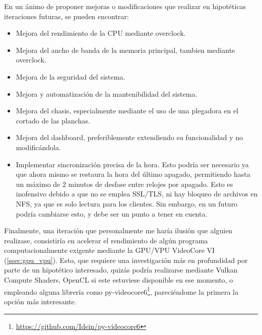 En un ánimo de proponer mejoras o modificaciones que realizar en hipotéticas iteraciones futuras, se pueden encontrar:
\begin{itemize}
    \item Mejora del rendimiento de la CPU mediante \gls{overclock}.
    \item Mejora del ancho de banda de la memoria principal, tambien mediante \gls{overclock}.
    \item Mejora de la seguridad del sistema.
    \item Mejora y automatización de la mantenibilidad del sistema.
    \item Mejora del chasis, especialmente mediante el uso de una plegadora en el cortado de las planchas.
    \item Mejora del dashboard, preferiblemente extendiendo su funcionalidad y no modificándola.
    \item Implementar sincronización precisa de la hora. Esto podría ser necesario ya que ahora mismo se restaura la hora del último apagado, permitiendo hasta un máximo de 2 minutos de desfase entre relojes por apagado. Esto es inofensivo debido a que no se emplea SSL/TLS, ni hay bloqueo de archivos en NFS, ya que es solo lectura para los clientes. Sin embargo, en un futuro podría cambiarse esto, y debe ser un punto a tener en cuenta.
\end{itemize}

Finalmente, una iteración que personalmente me haría ilusión que alguien realizase, consistiría en acelerar el rendimiento de algún programa computacionalmente exigente mediante la GPU/VPU VideoCore VI (\ref{ssec:gpu_vpu}). Esto, que requiere una investigación más en profundidad por parte de un hipotético interesado, quizás podría realizarse mediante Vulkan Compute Shaders, OpenCL si este estuviese disponible en ese momento, o empleando alguna librería como py-videocore6\footnote{\url{https://github.com/Idein/py-videocore6}}, pareciéndome la primera la opción más interesante.